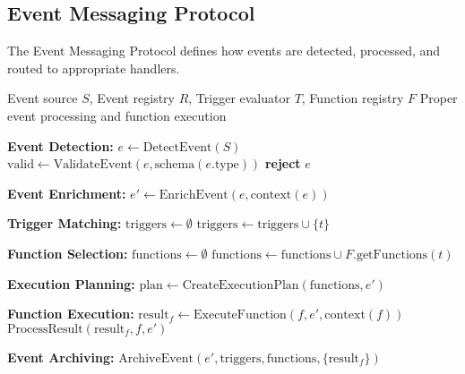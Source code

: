 \subsection{Event Messaging Protocol}
\label{subsec:event-messaging-protocol}

The Event Messaging Protocol defines how events are detected, processed, and routed to appropriate handlers.

\begin{protocol}
\label{prot:event-processing}
\begin{algorithmic}[1]
\Require Event source $S$, Event registry $R$, Trigger evaluator $T$, Function registry $F$
\Ensure Proper event processing and function execution

\State \textbf{Event Detection:}
\State $e \gets \text{DetectEvent}(S)$ 
\State $\text{valid} \gets \text{ValidateEvent}(e, \text{schema}(e.\text{type}))$
    \State \textbf{reject} $e$
\EndIf

\State \textbf{Event Enrichment:}
\State $e' \gets \text{EnrichEvent}(e, \text{context}(e))$ 

\State \textbf{Trigger Matching:}
\State $\text{triggers} \gets \emptyset$
        \State $\text{triggers} \gets \text{triggers} \cup \{t\}$
    \EndIf
\EndFor

\State \textbf{Function Selection:}
\State $\text{functions} \gets \emptyset$
    \State $\text{functions} \gets \text{functions} \cup F.\text{getFunctions}(t)$
\EndFor

\State \textbf{Execution Planning:}
\State $\text{plan} \gets \text{CreateExecutionPlan}(\text{functions}, e')$

\State \textbf{Function Execution:}
    \State $\text{result}_f \gets \text{ExecuteFunction}(f, e', \text{context}(f))$
    \State $\text{ProcessResult}(\text{result}_f, f, e')$
\EndFor

\State \textbf{Event Archiving:}
\State $\text{ArchiveEvent}(e', \text{triggers}, \text{functions}, \{\text{result}_f\})$
\end{algorithmic}
\end{protocol}
